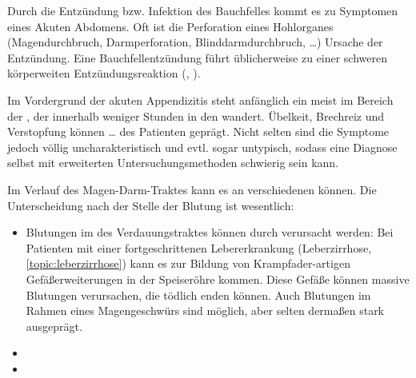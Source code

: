 \documentclass[
ngerman,
paper=a4,
asymmetric,
fontsize=10pt,
draft=false,
numbers=noenddot,
bibtotocnumbered,
footnotes=multiple,
]{scrreprt}
\begin{document}
Durch die Entzündung bzw. Infektion  des Bauchfelles
kommt es zu Symptomen eines Akuten Abdomens. Oft ist die Perforation
 eines Hohlorganes  (Magendurchbruch, Darmperforation,
 Blinddarmdurchbruch, \ldots) Ursache der Entzündung. 
Eine Bauchfellentzündung führt üblicherweise zu einer
schweren  körperweiten Entzündungsreaktion
(,
).


Im Vordergrund der akuten Appendizitis
steht anfänglich  ein meist  im Bereich der
, der
innerhalb weniger Stunden in den 
wandert. Übelkeit, Brechreiz und Verstopfung können
\ldots
des Patienten geprägt. Nicht selten sind die Symptome jedoch
völlig uncharakteristisch und evtl. sogar untypisch, sodass
eine Diagnose selbst mit erweiterten Untersuchungsmethoden
schwierig sein kann.

 Im Verlauf des Magen-Darm-Traktes kann es an verschiedenen
können. Die Unterscheidung nach der Stelle der Blutung ist
wesentlich:
\begin{itemize}
  \item Blutungen im  des Verdauungstraktes können
  durch
  verursacht werden: Bei Patienten
  mit einer fortgeschrittenen Lebererkrankung (Leberzirrhose, 
  \ref{topic:leberzirrhose}) kann es zur Bildung von 
  Krampfader-artigen Gefäßerweiterungen in der Speiseröhre
  kommen. Diese Gefäße können massive Blutungen verursachen,
  die tödlich enden können. Auch Blutungen im Rahmen eines
  Magengeschwürs sind möglich, aber selten dermaßen stark
  ausgeprägt.
  \item {}
  \item {}
\end{itemize}
\end{document}
